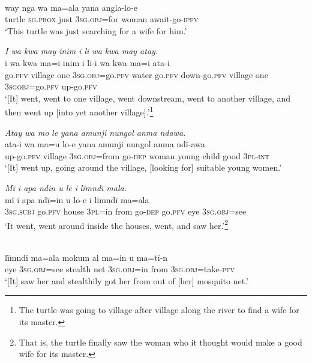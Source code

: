 \\
\gll way  nga      wa   ma=al{a} yana    {a}ng{la-lo-e}\\
turtle  \textsc{sg.prox}  just  3\textsc{sg.obj=}for  woman    await-go-\textsc{ipfv}\\
\glt ‘This turtle was just searching for a wife for him.’

\ex \negmedspace \textit{I wa kwa may inim i li wa kwa may atay.}\\
\gll i    wa    kwa  ma{=i} inim  i    li-i wa    kwa  ma{=i} ata-{i}\\
go.\textsc{pfv}  village  one    3\textsc{sg.obj}=go.\textsc{pfv}  water  go.\textsc{pfv}  down-go.\textsc{pfv} village  one    3\textsc{sgobj}=go.\textsc{pfv}  up-go.\textsc{pfv}\\
\glt ‘{[It] went, went to one village, went downstream, went to another village, and then went up [into yet another village].}’\footnote{The turtle was going to village after village along the river to find a wife for its master.}

\ex \negmedspace \textit{Atay wa mo} {\textit{le}} \textit{yana amunji nungol anma ndawa.}\\
\gll ata-{i} wa    m{a=u} {lo-e} yana    amu{n}ji  nungol  anma ndï-awa\\
up-go.\textsc{pfv}  village  3\textsc{sg.obj=}from  go-\textsc{dep}  woman    young  child  good 3\textsc{pl-int}\\
\glt ‘[It] went up, going around the village, [looking for] {suitable} young women.’

\ex \negmedspace \textit{Mï i apa nd}{\textit{in u le i}} \textit{lïmndï mala.}\\
\gll mï      i    apa  ndï=in  u      lo-e {i} lïmndï  ma=ala\\
3\textsc{sg.subj}  go.\textsc{pfv}  house  3\textsc{pl}=in  from  go-\textsc{dep}  go.\textsc{pfv}  eye    3\textsc{sg.obj}=see\\
\glt ‘It went, went around inside the house{s}, {went,} and saw her.’\footnote{That is, the turtle finally saw the woman who it thought would make a good wife for its master.}

\ex {}\\
\gll lïmndï  ma=ala    m{o}kum  al  m{a=i}n      u {ma=tï-n}\\
eye    3\textsc{sg.obj}=see  stealth    net  3\textsc{sg.obj}=in  from 3\textsc{sg.obj}=take-\textsc{pfv}\\
\glt ‘[It] saw her and stealthily got her from out of [her] mosquito net.’

